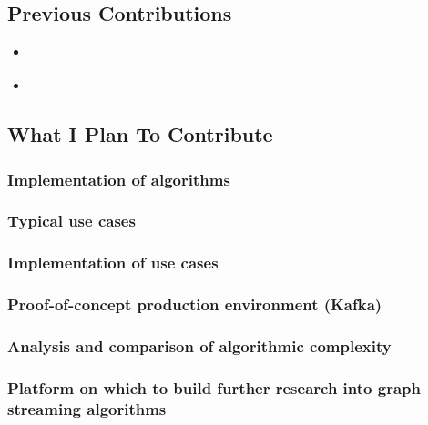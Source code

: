 \subsection{Previous Contributions}

\begin{itemize}
    \item \cite{chitnis_parameterized_2014}
    \item \cite{chitnis_kernelization_2015}
\end{itemize}

\subsection{What I Plan To Contribute}

\subsubsection{Implementation of algorithms}
\subsubsection{Typical use cases}
\subsubsection{Implementation of use cases}
\subsubsection{Proof-of-concept production environment (Kafka)}
\subsubsection{Analysis and comparison of algorithmic complexity}
\subsubsection{Platform on which to build further research into graph streaming algorithms}
